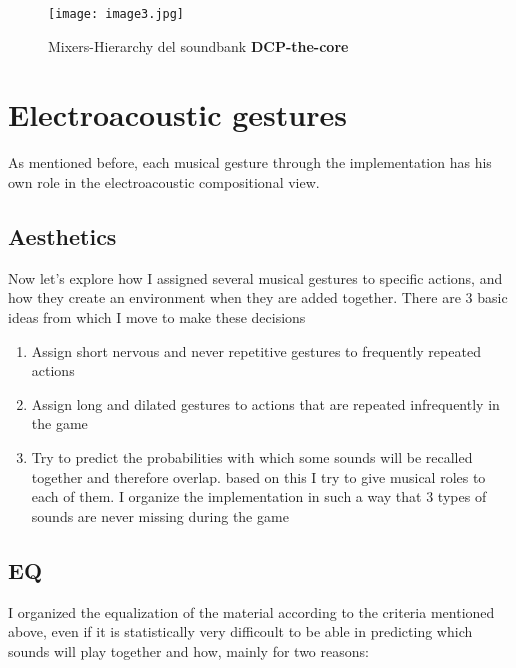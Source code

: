 	\begin{figure}[h]
		\begin{center}
			\texttt{[image: image3.jpg]}
			\caption{Mixers-Hierarchy del soundbank \textbf{DCP-the-core}}
		\end{center}
	\end{figure}

\section{Electroacoustic gestures}
As mentioned before, each musical gesture through the implementation has his own role in the electroacoustic compositional view.

	\subsection{Aesthetics}
	Now let's explore how I assigned several musical gestures to specific actions, and how they create an environment when they are added together. There are 3 basic ideas from which I move to make these decisions
		\begin{enumerate}
			\item Assign short nervous and never repetitive gestures to frequently repeated actions
			\item Assign long and dilated gestures to actions that are repeated infrequently in the game
			\item Try to predict the probabilities with which some sounds will be recalled together and therefore overlap. based on this I try to give musical roles to each of them. I organize the implementation in such a way that 3 types of sounds are never missing during the game
		\end{enumerate}
	
	\subsection{EQ}
	I organized the equalization of the material according to the criteria mentioned above, even if it is statistically very difficoult to be able in predicting which sounds will play together and how, mainly for two reasons:
	
